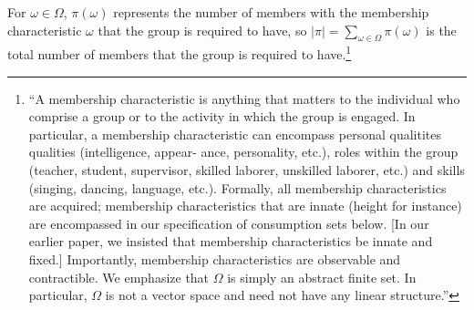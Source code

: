 \documentclass[12pt,letterpaper]{article}
\begin{document}
	For $\omega\in \Omega$, $\pi(\omega)$ represents the number of members with the membership characteristic $\omega$ that the group is required to have, so $|\pi|=\sum_{\omega\in\Omega}\pi(\omega)$ is the total number of members that the group is required to have.\footnote
		{
		``A membership characteristic is anything that matters to the individual who comprise a group or to the activity in which the group is engaged. In particular, a membership characteristic can encompass personal qualitites qualities (intelligence, appear- ance, personality, etc.), roles within the group (teacher, student, supervisor, skilled laborer, unskilled laborer, etc.) and skills (singing, dancing, language, etc.). Formally, all membership characteristics are acquired; membership characteristics that are innate (height for instance) are encompassed in our speciﬁcation of consumption sets below. [In our earlier paper, we insisted that membership characteristics be innate and ﬁxed.] Importantly, membership characteristics are observable and contractible. We emphasize that $\Omega$ is simply an abstract ﬁnite set. In particular, $\Omega$ is not a vector space and need not have any linear structure.''
	}
	
\end{document}
